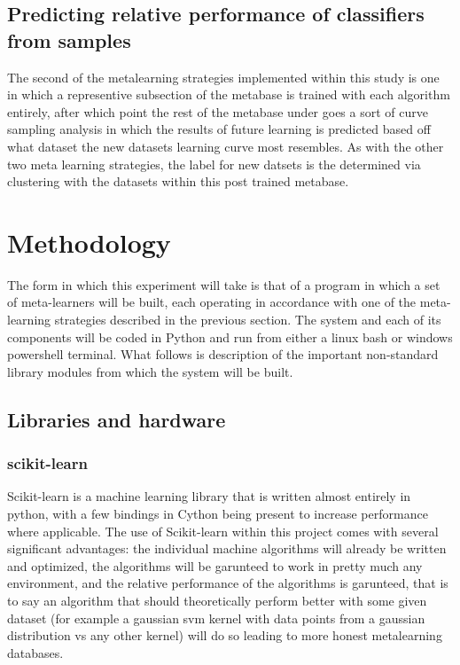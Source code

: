 \documentclass[a4paper,11pt]{article}
\begin{document}
\subsection{Predicting relative performance of classifiers from samples}
The second of the metalearning strategies implemented within this study is one in which
a representive subsection of the metabase is trained with each algorithm entirely, after
which point the rest of the metabase under goes a sort of curve sampling analysis in which
the results of future learning is predicted based off what dataset the new datasets learning
curve most resembles. \cite{Leite} As with the other two meta learning strategies, the label
for new datsets is the determined via clustering with the datasets within this post trained
metabase.

\section{Methodology}
The form in which this experiment will take is that of a program in which a set of meta-learners
will be built, each operating in accordance with one of the meta-learning strategies described in
the previous section. The system and each of its components will be coded in Python and run from either
a linux bash or windows powershell terminal. What follows is description of the important non-standard
library modules from which the system will be built.

\subsection{Libraries and hardware}
\subsubsection{scikit-learn}
Scikit-learn is a machine learning library that is written almost entirely in python, with a few
bindings in Cython being present to increase performance where applicable. The use of Scikit-learn
within this project comes with several significant advantages: the individual machine algorithms
will already be written and optimized, the algorithms will be garunteed to work in pretty much any
environment, and the relative performance of the algorithms is garunteed, that is to say an algorithm
that should theoretically perform better with some given dataset (for example a gaussian svm kernel
with data points from a gaussian distribution vs any other kernel) will do so leading to more honest
metalearning databases.
\end{document}
